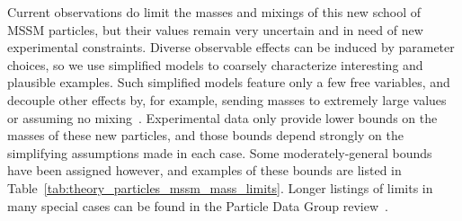 Current observations do limit the masses and mixings of this new
school of MSSM particles, but their values remain very uncertain and in need
of new experimental constraints.
Diverse observable effects can be induced by parameter choices,
so we use simplified models to coarsely characterize interesting and plausible
examples.
Such simplified models feature only a few free variables, and decouple other
effects by, for example, sending masses to extremely large values or assuming
no mixing~\cite{
atlas2022searches,
alwall2009simplified,
alves20212simplified
}.
Experimental data only provide lower bounds on the masses of these new
particles, and those bounds depend strongly on the simplifying assumptions
made in each case. Some moderately-general bounds have been assigned however,
and examples of these bounds are listed in
Table~\ref{tab:theory_particles_mssm_mass_limits}.
Longer listings of limits in many special cases can be found in the
Particle Data Group review~\cite{pdg2022ynf}.


